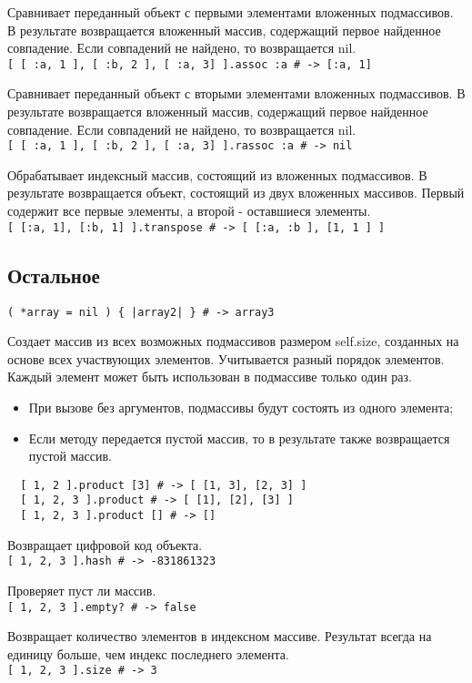 \begin{methodlist}
  Сравнивает переданный объект с первыми элементами вложенных подмассивов. В результате возвращается вложенный массив, содержащий первое найденное совпадение. Если совпадений не найдено, то возвращается nil. 
  \\\verb![ [ :a, 1 ], [ :b, 2 ], [ :a, 3] ].assoc :a # -> [:a, 1]!

  Сравнивает переданный объект с вторыми элементами вложенных подмассивов. В результате возвращается вложенный массив, содержащий первое найденное совпадение. Если совпадений не найдено, то возвращается nil. 
  \\\verb![ [ :a, 1 ], [ :b, 2 ], [ :a, 3] ].rassoc :a # -> nil!
 
  Обрабатывает индексный массив, состоящий из вложенных подмассивов. В результате возвращается объект, состоящий из двух вложенных массивов. Первый содержит все первые элементы, а второй - оставшиеся элементы. 
  \\\verb![ [:a, 1], [:b, 1] ].transpose # -> [ [:a, :b ], [1, 1 ] ]!
\end{methodlist} 

\subsection*{Остальное}

\begin{methodlist}
  \verb!( *array = nil ) { |array2| } # -> array3!

  Создает массив из всех возможных подмассивов размером self.size, созданных на основе всех участвующих элементов. Учитывается разный порядок элементов. Каждый элемент может быть использован в подмассиве только один раз.
  \begin{itemize}
    \item При вызове без аргументов, подмассивы будут состоять из одного элемента;
    \item Если методу передается пустой массив, то в результате также возвращается пустой массив.
  \end{itemize}
  \begin{verbatim}
  [ 1, 2 ].product [3] # -> [ [1, 3], [2, 3] ]
  [ 1, 2, 3 ].product # -> [ [1], [2], [3] ] 
  [ 1, 2, 3 ].product [] # -> []
  \end{verbatim}

  Возвращает цифровой код объекта. 
  \\\verb![ 1, 2, 3 ].hash # -> -831861323!

  Проверяет пуст ли массив. 
  \\\verb![ 1, 2, 3 ].empty? # -> false!

  Возвращает количество элементов в индексном массиве. Результат всегда на единицу больше, чем индекс последнего элемента. 
  \\\verb![ 1, 2, 3 ].size # -> 3!
 \end{methodlist}

